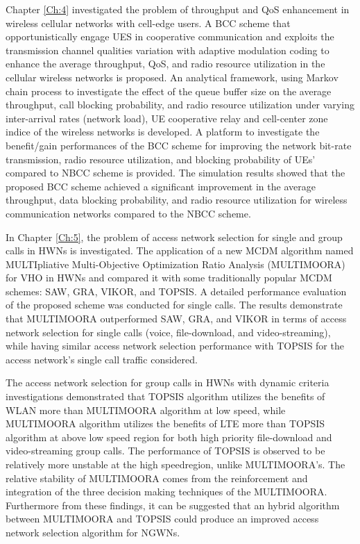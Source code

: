 Chapter \ref{Ch:4}  investigated the problem of throughput and QoS enhancement in wireless cellular networks with cell-edge users. A BCC scheme that  opportunistically  engage UES in cooperative communication and  exploits the transmission channel qualities variation with adaptive modulation coding to enhance the average throughput, QoS, and radio resource utilization in the cellular wireless  networks is proposed.  An analytical framework, using Markov chain process to investigate the effect of the queue buffer size on the average throughput, call  blocking probability, and radio resource utilization under varying inter-arrival rates (network  load),  UE cooperative relay  and cell-center zone  indice of the wireless networks is developed. A platform to investigate the benefit/gain performances of the  BCC scheme for improving the network bit-rate transmission, radio resource utilization, and blocking probability of  UEs' compared to NBCC scheme is provided. The simulation results showed that the proposed BCC scheme achieved a significant improvement in the average  throughput,  data blocking probability, and radio resource utilization for wireless communication networks compared to the NBCC scheme. \par 
 
In Chapter \ref{Ch:5},  the problem of access network selection  for single and group calls in HWNs is investigated.  The application of a new MCDM algorithm named  MULTIpliative Multi-Objective Optimization Ratio  Analysis (MULTIMOORA) for VHO in HWNs and compared it with some traditionally popular  MCDM schemes: SAW, GRA, VIKOR, and TOPSIS.   A detailed performance evaluation of the proposed scheme  was conducted for single calls.  The results demonstrate that MULTIMOORA outperformed SAW, GRA, and VIKOR in terms of access network selection for single calls (voice, file-download, and video-streaming), while having similar access network selection performance with TOPSIS for the  access  network's single call  traffic considered. 



The access network selection for group calls in HWNs with dynamic criteria investigations  demonstrated that TOPSIS algorithm utilizes the  benefits of  WLAN more than MULTIMOORA algorithm  at low speed, while MULTIMOORA algorithm  utilizes the benefits of LTE more than TOPSIS algorithm  at above low speed region for both high priority file-download and video-streaming group calls.   The  performance of TOPSIS is observed to be relatively more unstable at the high speed\textendash region, unlike MULTIMOORA's.
 The relative stability of MULTIMOORA comes from the reinforcement and integration of the  three decision making techniques of the MULTIMOORA. Furthermore from these findings, it can be suggested that  an  hybrid algorithm between MULTIMOORA and TOPSIS could produce an improved  access network selection algorithm for NGWNs.


